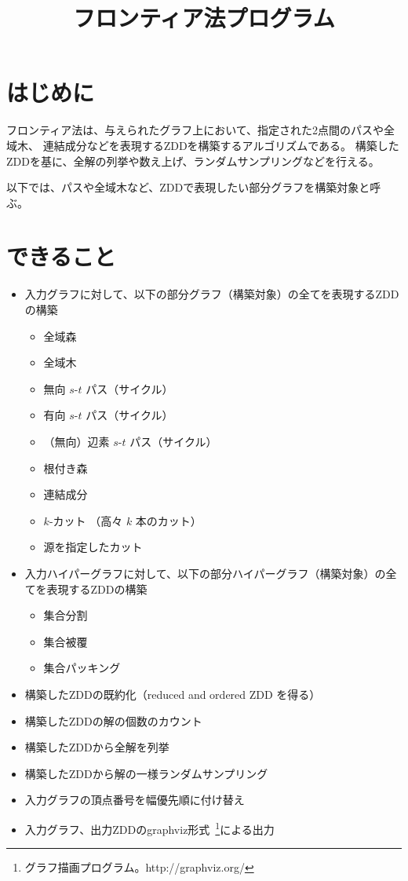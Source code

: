 \documentclass{jsarticle}
\title{フロンティア法プログラム}
\begin{document}
\maketitle

\section{はじめに}

フロンティア法は、与えられたグラフ上において、指定された2点間のパスや全域木、
連結成分などを表現するZDDを構築するアルゴリズムである。
構築したZDDを基に、全解の列挙や数え上げ、ランダムサンプリングなどを行える。

以下では、パスや全域木など、ZDDで表現したい部分グラフを構築対象と呼ぶ。

\section{できること}

\begin{itemize}
\item 入力グラフに対して、以下の部分グラフ（構築対象）の全てを表現するZDDの構築
\begin{itemize}
\item 全域森
\item 全域木
\item 無向 $s$-$t$ パス（サイクル）
\item 有向 $s$-$t$ パス（サイクル）
\item （無向）辺素 $s$-$t$ パス（サイクル）
\item 根付き森
\item 連結成分
\item $k$-カット （高々 $k$ 本のカット）
\item 源を指定したカット
\end{itemize}
\item 入力ハイパーグラフに対して、以下の部分ハイパーグラフ（構築対象）の全てを表現するZDDの構築
\begin{itemize}
\item 集合分割
\item 集合被覆
\item 集合パッキング
\end{itemize}
\item 構築したZDDの既約化（reduced and ordered ZDD を得る）
\item 構築したZDDの解の個数のカウント
\item 構築したZDDから全解を列挙
\item 構築したZDDから解の一様ランダムサンプリング
\item 入力グラフの頂点番号を幅優先順に付け替え
\item 入力グラフ、出力ZDDのgraphviz形式~\footnote{グラフ描画プログラム。http://graphviz.org/}による出力
\end{itemize}
\end{document}
